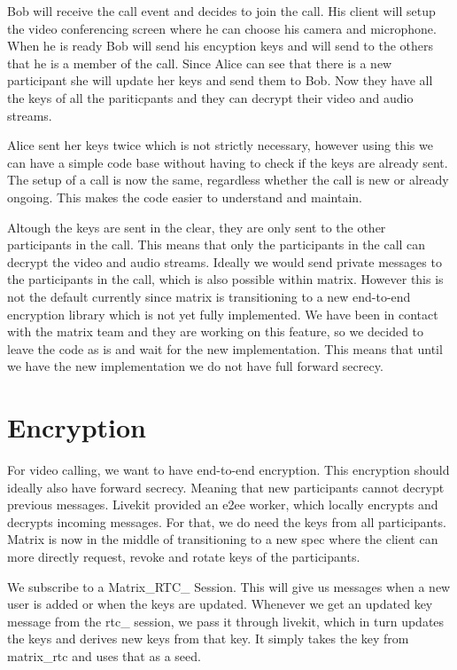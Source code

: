 \documentclass{report}
\begin{document}
    Bob will receive the call event and decides to join the call. His client will setup the video conferencing
    screen where he can choose his camera and microphone. When he is ready Bob will send his encyption keys and will
    send to the others that he is a member of the call. Since Alice can see that there is a new participant she will
    update her keys and send them to Bob. Now they have all the keys of all the pariticpants and they can decrypt their
    video and audio streams.

    Alice sent her keys twice which is not strictly necessary, however using this we can have a simple code base
    without having to check if the keys are already sent. The setup of a call is now the same, regardless whether
    the call is new or already ongoing. This makes the code easier to understand and maintain.

    Altough the keys are sent in the clear, they are only sent to the other participants in the call. This means that
    only the participants in the call can decrypt the video and audio streams. Ideally we would send private
    messages to the participants in the call, which is also possible within matrix. However this is not the default
    currently since matrix is transitioning to a new end-to-end encryption library which is not yet fully implemented.
    We have been in contact with the matrix team and they are working on this feature, so we decided to leave the code
    as is and wait for the new implementation. This means that until we have the new implementation we do not have
    full forward secrecy.



    \section{Encryption}

    For video calling, we want to have end-to-end encryption. This encryption should ideally also have forward secrecy.
    Meaning that new participants cannot decrypt previous messages. Livekit provided an e2ee worker, which locally
    encrypts and decrypts incoming messages. For that, we do need the keys from all participants. Matrix is now in the
    middle of transitioning to a new spec where the client can more directly request, revoke and rotate keys of the
    participants.

    We subscribe to a Matrix\_RTC\_
    Session. This will give us messages when a new user is added or when the keys are updated. Whenever we get an
    updated key message from the rtc\_
    session, we pass it through livekit, which in turn updates the keys and derives new keys from that key. It simply
    takes the key from matrix\_rtc and uses that as a seed.
\end{document}
